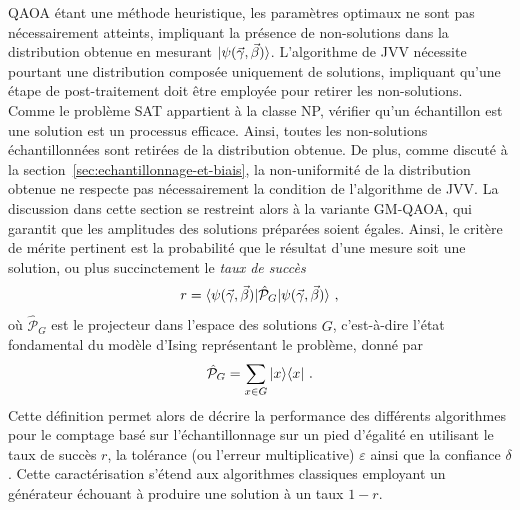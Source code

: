 QAOA étant une méthode heuristique, les paramètres optimaux ne sont pas nécessairement atteints, impliquant la présence de non-solutions dans la distribution obtenue en mesurant $\ket{\psi(\vec{\gamma}, \vec{\beta})}$. L'algorithme de JVV nécessite pourtant une distribution composée uniquement de solutions, impliquant qu'une étape de post-traitement doit être employée pour retirer les non-solutions. Comme le problème SAT appartient à la classe \textsf{NP}, vérifier qu'un échantillon est une solution est un processus efficace. Ainsi, toutes les non-solutions échantillonnées sont retirées de la distribution obtenue. De plus, comme discuté à la section~\ref{sec:echantillonnage-et-biais}, la non-uniformité de la distribution obtenue ne respecte pas nécessairement la condition de l'algorithme de JVV. La discussion dans cette section se restreint alors à la variante GM-QAOA, qui garantit que les amplitudes des solutions préparées soient égales. Ainsi, le critère de mérite pertinent est la probabilité que le résultat d'une mesure soit une solution, ou plus succinctement le \textit{taux de succès}
\begin{equation}
    r = \braket{ \psi(\vec{\gamma}, \vec{\beta}) | \hat{\mathcal{P}}_{G} | \psi(\vec{\gamma}, \vec{\beta}) } \,,
\end{equation}
où $\hat{\mathcal{P}}_{G}$ est le projecteur dans l'espace des solutions $G$, c'est-à-dire l'état fondamental du modèle d'Ising représentant le problème, donné par
\begin{equation}
    \hat{\mathcal{P}}_{G} = \sum_{x \in G} \ket{x}\!\bra{x} \,.
\end{equation}
Cette définition permet alors de décrire la performance des différents algorithmes pour le comptage basé sur l'échantillonnage sur un pied d'égalité en utilisant le taux de succès $r$, la tolérance (ou l'erreur multiplicative) $\varepsilon$ ainsi que la confiance $\delta$. Cette caractérisation s'étend aux algorithmes classiques employant un générateur échouant à produire une solution à un taux $1 - r$.

